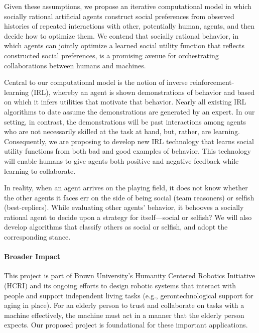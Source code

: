 Given these assumptions, we propose an iterative computational model
in which socially rational artificial agents construct social
preferences from observed histories of repeated interactions with
other, potentially human, agents, and then decide how to optimize
them.  We contend that socially rational behavior, in which agents can
jointly optimize a learned social utility function that reflects
constructed social preferences, is a promising avenue for
orchestrating collaborations between humans and machines.

Central to our computational model is the notion of inverse
reinforcement-learning (IRL), whereby an agent is shown demonstrations
of behavior and based on which it infers utilities that motivate that
behavior.  Nearly all existing IRL algorithms to date assume the
demonstrations are generated by an expert.  In our setting, in
contrast, the demonstrations will be past interactions among agents
who are not necessarily skilled at the task at hand, but, rather, are learning.
Consequently, we are proposing to develop
new IRL technology that learns social utility functions from
both bad and good examples of behavior.  This technology will enable
humans to give agents both positive and negative feedback while
learning to collaborate.

In reality, when an agent arrives on the playing field, it does not
know whether the other agents it faces err on the side of being social
(team reasoners) or selfish (best-repliers).  While evaluating
other agents' behavior, it behooves a socially rational agent to
decide upon a strategy for itself---social or selfish?
%
We will also develop algorithms that classify others as social or
selfish, and adopt the corresponding stance.



\vspace{\up}
\paragraph{Broader Impact}
%
This project is part of Brown University's Humanity Centered
Robotics Initiative (HCRI) and its ongoing efforts to design robotic
systems that interact with people and support independent living tasks
(e.g., gerontechnological support for aging in place).  For an elderly
person to trust and collaborate on tasks with a machine effectively,
the machine must act in a manner that the elderly person expects.  Our
proposed project is foundational for these
important applications.

